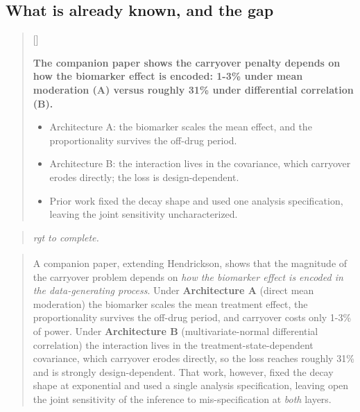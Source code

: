 \documentclass[
  11pt,
]{article}
\newcounter{pgraph}
\newenvironment{bullets}{%
  \stepcounter{pgraph}%
  \begin{quote}\small\sffamily\color[gray]{0.30}%
  {\normalfont\scriptsize\color[gray]{0.58}[\thepgraph]\enspace}}{%
  \end{quote}}
\newenvironment{rgt}{%
  \begin{quote}\small\itshape\color[RGB]{20,60,160}}{%
  \end{quote}}
\newenvironment{orig}{%
  \begin{quote}\normalsize\color[gray]{0.55}}{%
  \end{quote}}
\begin{document}
\subsection{What is already known, and the gap}\label{what-is-already-known-and-the-gap}

\begin{bullets}

\textbf{The companion paper shows the carryover penalty depends on
how the biomarker effect is encoded: 1-3\% under mean moderation
(A) versus roughly 31\% under differential correlation (B).}

\begin{itemize}\setlength{\itemsep}{2pt}\setlength{\parskip}{0pt}
\item Architecture A: the biomarker scales the mean effect, and the
proportionality survives the off-drug period.
\item Architecture B: the interaction lives in the covariance, which
carryover erodes directly; the loss is design-dependent.
\item Prior work fixed the decay shape and used one analysis
specification, leaving the joint sensitivity uncharacterized.
\end{itemize}

\end{bullets}

\begin{rgt}
rgt to complete.

\end{rgt}

\begin{orig}
A companion paper\textsuperscript{}, extending
Hendrickson\textsuperscript{}, shows that the magnitude of the
carryover problem depends on \emph{how the biomarker effect is encoded in
the data-generating process}. Under \textbf{Architecture A} (direct mean
moderation) the biomarker scales the mean treatment effect, the
proportionality survives the off-drug period, and carryover costs only 1-3\% of
power. Under \textbf{Architecture B} (multivariate-normal differential
correlation) the interaction lives in the treatment-state-dependent
covariance, which carryover erodes directly, so the loss reaches
roughly 31\% and is strongly design-dependent. That work, however,
fixed the decay shape at exponential and used a single analysis
specification, leaving open the joint sensitivity of the inference
to mis-specification at \emph{both} layers.

\end{orig}
\end{document}
